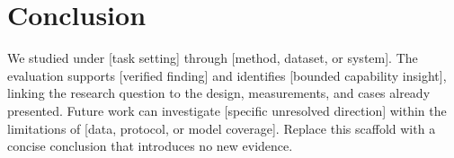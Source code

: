\section{Conclusion}
\label{sec:conclusion}

We studied \CoreTerm{} under [task setting] through [method, dataset, or system]. The evaluation supports [verified finding] and identifies [bounded capability insight], linking the research question to the design, measurements, and cases already presented. Future work can investigate [specific unresolved direction] within the limitations of [data, protocol, or model coverage]. Replace this scaffold with a concise conclusion that introduces no new evidence.

